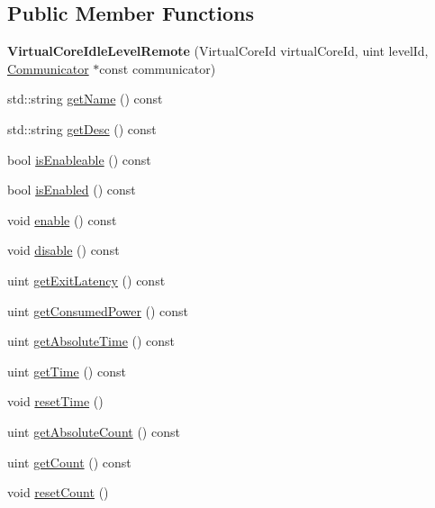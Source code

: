 \subsection*{Public Member Functions}
\begin{DoxyCompactItemize}
\item 
\hypertarget{classmammut_1_1topology_1_1VirtualCoreIdleLevelRemote_a974bc56791cc3c5960056d1c259eb149}{{\bfseries Virtual\-Core\-Idle\-Level\-Remote} (Virtual\-Core\-Id virtual\-Core\-Id, uint level\-Id, \hyperlink{classmammut_1_1Communicator}{Communicator} $\ast$const communicator)}\label{classmammut_1_1topology_1_1VirtualCoreIdleLevelRemote_a974bc56791cc3c5960056d1c259eb149}

\item 
std\-::string \hyperlink{classmammut_1_1topology_1_1VirtualCoreIdleLevelRemote_a1c940e97ef1bd3a168ce58c468ef6bc9}{get\-Name} () const 
\item 
std\-::string \hyperlink{classmammut_1_1topology_1_1VirtualCoreIdleLevelRemote_a0494e117c0109b94402a18bb97ce97f1}{get\-Desc} () const 
\item 
bool \hyperlink{classmammut_1_1topology_1_1VirtualCoreIdleLevelRemote_a3ba5abd917f53089191ae567fb96bc5a}{is\-Enableable} () const 
\item 
bool \hyperlink{classmammut_1_1topology_1_1VirtualCoreIdleLevelRemote_ad4750a0e885e9ce03d83440a3017c6c0}{is\-Enabled} () const 
\item 
void \hyperlink{classmammut_1_1topology_1_1VirtualCoreIdleLevelRemote_a90fe305ff0f076a6a6c36e6e0a3960f3}{enable} () const 
\item 
void \hyperlink{classmammut_1_1topology_1_1VirtualCoreIdleLevelRemote_aed50c767fc35858e7c1e2bed65566661}{disable} () const 
\item 
uint \hyperlink{classmammut_1_1topology_1_1VirtualCoreIdleLevelRemote_a718403df133e2d0833cbcc7ca2d2b222}{get\-Exit\-Latency} () const 
\item 
uint \hyperlink{classmammut_1_1topology_1_1VirtualCoreIdleLevelRemote_ab7742d64cb5e9db75903df23b5ffac28}{get\-Consumed\-Power} () const 
\item 
uint \hyperlink{classmammut_1_1topology_1_1VirtualCoreIdleLevelRemote_af1837403943f3a4a4e4b9c53051668dd}{get\-Absolute\-Time} () const 
\item 
uint \hyperlink{classmammut_1_1topology_1_1VirtualCoreIdleLevelRemote_a7dd1374dd63b5d5ad59613162d689559}{get\-Time} () const 
\item 
void \hyperlink{classmammut_1_1topology_1_1VirtualCoreIdleLevelRemote_a15c5043370fb096350af0c74d497908e}{reset\-Time} ()
\item 
uint \hyperlink{classmammut_1_1topology_1_1VirtualCoreIdleLevelRemote_a7cb52d93c7fff96c7d8e299b7a0cbdd8}{get\-Absolute\-Count} () const 
\item 
uint \hyperlink{classmammut_1_1topology_1_1VirtualCoreIdleLevelRemote_aa203d9b76cb6b9c721f61c343e342814}{get\-Count} () const 
\item 
void \hyperlink{classmammut_1_1topology_1_1VirtualCoreIdleLevelRemote_aa3f49ed20ca10011d01174fdf6bde3e2}{reset\-Count} ()
\end{DoxyCompactItemize}
